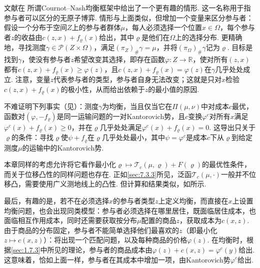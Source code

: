 文献\cite{b56}在\label{idx:i31-p283}
所谓Cournot--Nash均衡框架中给出了一个更有趣的情形. 这一名称用于指参与者可以区分的无原子博弈. 情形与上面类似，但增加一个变量来区分参与者：假设一个分布于空间$Z$上的参与者群体$\mu$，每人必须选择一个位置$x\in\Omega$，每个参与者$z$的收益由$c(z,x)+f_\varrho(x)$给出，其中$\varrho$是他们在$\Omega$上的选择分布. 更精确地，寻找测度$\gamma\in\mathscr P(Z\times\Omega)$，满足$(\pi_Z)_\#\gamma=\mu$，并将$(\pi_\Omega)_\#\gamma$记为$\varrho$. 目标是找到$\gamma$，使没有参与者$z$希望改变其选择，即存在函数$\varphi:Z\to\mathbb R$，使对所有$(z,x)$都有$c(z,x)+f_\varrho(x)\geq\varphi(z)$，且$c(z,x)+f_\varrho(x)=\varphi(z)$在$\gamma$几乎处处成立. 注意，变量$z$代表参与者的类型，参与者自身无法改变；这就是只对$x$检验$c(z,x)+f_\varrho(x)$的极小性，从而给出依赖于$z$的最小值的原因.

不难证明下列事实（见\cite{b56}）：测度$\gamma$为均衡，当且仅当它在$\Pi(\mu,\nu)$中对成本$c$最优，函数对$(\varphi,-f_\varrho)$是同一运输问题的一对Kantorovich势，且$c$变换$\varphi^c$对所有$x$满足$\varphi^c(x)+f_\varrho(x)\geq0$，并在$\varrho$几乎处处满足$\varphi^c(x)+f_\varrho(x)=0$. 这导出只关于$\varrho$的条件：寻找$\varrho$使$\psi+f_\varrho$在$\varrho$几乎处处最小，其中$\psi=\varphi^c$是成本$c$下从$\varrho$到给定测度$\mu$的运输中的Kantorovich势.

本章同样的考虑允许将它看作最小化$\varrho\mapsto\mathscr T_c(\mu,\varrho)+F(\varrho)$的最优性条件，而关于位移凸性的同样问题也存在. 正如\autoref{sec:7.3.3}所见，泛函$\mathscr T_c(\mu,\cdot)$一般并不位移凸，需要使用广义测地线上的凸性. 但计算和结果类似，如\cite{b56}所示.

最后，有趣的是，若不在必须选择$x$的参与者类型$z$上定义均衡，而直接在$x$上设置均衡问题，也会出现同类模型：参与者必须选择在哪里居住，既面临居住成本，也面临相互作用成本，同时还需要获取按分布$\mu$配置的商品$z$，获取成本为$c(x,z)$. 由于商品的分布固定，参与者不能简单选择他们最喜欢的$z$（即最小化$z\mapsto c(x,z)$）：将出现一个匹配问题，以及每种商品的价格$\varphi(z)$. 在均衡时，根据\autoref{sec:1.7.3}中所见的理论，参与者的商品成本由$\varphi(z)+c(x,z)=\varphi^c(y)$给出. 这意味着，恰如上面一样，参与者在其成本中增加一项，由Kantorovich势$\varphi^c$给出.
